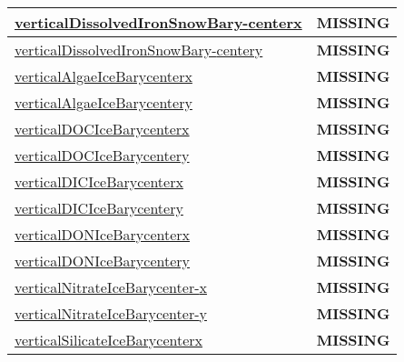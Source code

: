 {\begin{center}
\begin{longtable}{| p{2.0in} | p{4.0in} |}
    \hline
    \hyperref[subsec:var_sec_tracer_barycenter_verticalDissolvedIronSnowBarycenterx]{verticalDissolvedIronSnowBary-}\hyperref[subsec:var_sec_tracer_barycenter_verticalDissolvedIronSnowBarycenterx]{centerx  }& {\bf \color{red} MISSING} \\
    \hline
    \hyperref[subsec:var_sec_tracer_barycenter_verticalDissolvedIronSnowBarycentery]{verticalDissolvedIronSnowBary-}\hyperref[subsec:var_sec_tracer_barycenter_verticalDissolvedIronSnowBarycentery]{centery  }& {\bf \color{red} MISSING} \\
    \hline
    \hyperref[subsec:var_sec_tracer_barycenter_verticalAlgaeIceBarycenterx]{verticalAlgaeIceBarycenterx} & {\bf \color{red} MISSING} \\
    \hline
    \hyperref[subsec:var_sec_tracer_barycenter_verticalAlgaeIceBarycentery]{verticalAlgaeIceBarycentery} & {\bf \color{red} MISSING} \\
    \hline
    \hyperref[subsec:var_sec_tracer_barycenter_verticalDOCIceBarycenterx]{verticalDOCIceBarycenterx} & {\bf \color{red} MISSING} \\
    \hline
    \hyperref[subsec:var_sec_tracer_barycenter_verticalDOCIceBarycentery]{verticalDOCIceBarycentery} & {\bf \color{red} MISSING} \\
    \hline
    \hyperref[subsec:var_sec_tracer_barycenter_verticalDICIceBarycenterx]{verticalDICIceBarycenterx} & {\bf \color{red} MISSING} \\
    \hline
    \hyperref[subsec:var_sec_tracer_barycenter_verticalDICIceBarycentery]{verticalDICIceBarycentery} & {\bf \color{red} MISSING} \\
    \hline
    \hyperref[subsec:var_sec_tracer_barycenter_verticalDONIceBarycenterx]{verticalDONIceBarycenterx} & {\bf \color{red} MISSING} \\
    \hline
    \hyperref[subsec:var_sec_tracer_barycenter_verticalDONIceBarycentery]{verticalDONIceBarycentery} & {\bf \color{red} MISSING} \\
    \hline
    \hyperref[subsec:var_sec_tracer_barycenter_verticalNitrateIceBarycenterx]{verticalNitrateIceBarycenter-}\hyperref[subsec:var_sec_tracer_barycenter_verticalNitrateIceBarycenterx]{x  }& {\bf \color{red} MISSING} \\
    \hline
    \hyperref[subsec:var_sec_tracer_barycenter_verticalNitrateIceBarycentery]{verticalNitrateIceBarycenter-}\hyperref[subsec:var_sec_tracer_barycenter_verticalNitrateIceBarycentery]{y  }& {\bf \color{red} MISSING} \\
    \hline
    \hyperref[subsec:var_sec_tracer_barycenter_verticalSilicateIceBarycenterx]{verticalSilicateIceBarycenterx} & {\bf \color{red} MISSING} \\

\end{longtable}
\end{center}}
